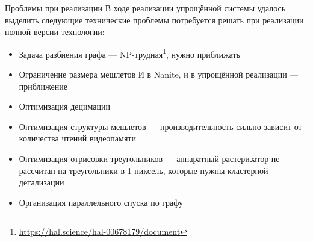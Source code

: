 \begin{frame}{Проблемы при реализации}
    В ходе реализации упрощённой системы удалось выделить следующие технические проблемы потребуется решать при реализации полной версии технологии:
    \begin{itemize}
        \item Задача разбиения графа --- NP-трудная\footnote{\url{https://hal.science/hal-00678179/document}}, нужно приближать
        \item Ограничение размера мешлетов
        И в Nanite, и в упрощённой реализации --- приближение
        \item Оптимизация децимации
        \item Оптимизация структуры мешлетов
        --- производительность сильно зависит от количества чтений видеопамяти
        \item Оптимизация отрисовки треугольников
        --- аппаратный растеризатор не рассчитан на треугольники в 1 пиксель, которые нужны кластерной детализации
        \item Организация параллельного спуска по графу
    \end{itemize}
\end{frame}
